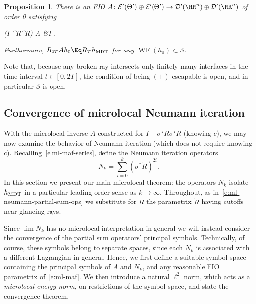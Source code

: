 \documentclass[10pt]{article}
\theoremstyle{plain}
\newtheorem{proposition}[theorem]{Proposition}
\theoremstyle{definition}
\theoremstyle{remark}
\numberwithin{theorem}{section}
\numberwithin{example}{section}
\numberwithin{equation}{section}
\numberwithin{figure}{section}
\DeclareMathOperator\WF{WF}		%
\newcommand\MDT{\ensuremath{_{\text{\normalfont MDT}}}}	%
\newcommand\eqml{\Eq}					%
\begin{document}
\begin{proposition}
	There is an FIO $A\colon \mathcal E'(\Theta')\oplus \mathcal E'(\Theta')\to\mathcal D'(\RR^n)\oplus\mathcal D'(\RR^n)$ of order 0 satisfying
	\begin{nalign}
		(I-\sigma^\star R\sigma^\star R) A &\eqml I
		\quad{}.
	\end{nalign}
	Furthermore, $R_{2T}Ah_0\eqml R_T h\MDT$ for any $\WF(h_0)\subset\mathcal S$.
	
	\label{p:constructive-parametrix}
\end{proposition}

Note that, because any broken ray intersects only finitely many interfaces in the time interval $t\in[0,2T]$, the condition of being $(\pm)$-escapable is open, and in particular $\mathcal S$ is open.




\subsection{Convergence of microlocal Neumann iteration}					\label{s:ml-convergence}

With the microlocal inverse $A$ constructed for $I-\sigma^\star R\sigma^\star R$ (knowing $c$), we may now examine the behavior of Neumann iteration (which does not require knowing $c$). Recalling~\eqref{e:ml-maf-series}, define the Neumann iteration operators
\begin{equation}
	N_k = \sum_{i=0}^k (\sigma^*\tilde R)^{2i}.
	\label{e:ml-neumann-partial-sum-ops}
\end{equation}
In this section we present our main microlocal theorem: the operators $N_k$ isolate $h\MDT$ in a particular leading order sense as $k\to\infty$. Throughout, as in~\eqref{e:ml-neumann-partial-sum-ops} we substitute for $R$ the parametrix $\tilde R$ having cutoffs near glancing rays.

Since $\lim N_k$ has no microlocal interpretation in general we will instead consider the convergence of the partial sum operators' principal symbols. Technically, of course, these symbols belong to separate spaces, since each $N_k$ is associated with a different Lagrangian in general. Hence, we first define a suitable symbol space containing the principal symbols of $A$ and $N_k$, and any reasonable FIO parametrix of~\eqref{e:ml-maf}. We then introduce a natural $\ell^2$ norm, which acts as a \emph{microlocal energy norm}, on restrictions of the symbol space, and state the convergence theorem.
\end{document}
